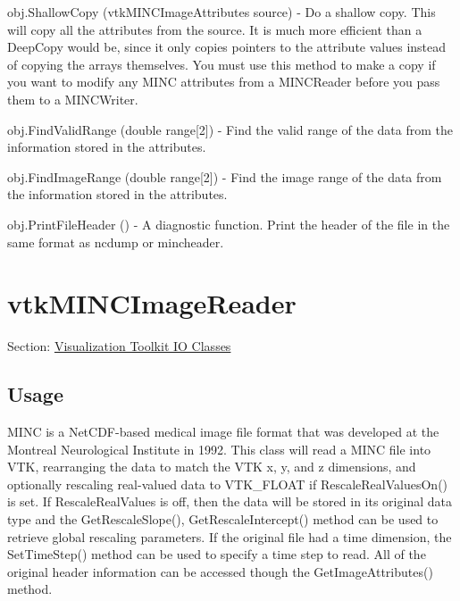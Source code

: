 \begin{DoxyItemize}
\item {\ttfamily obj.\-Shallow\-Copy (vtk\-M\-I\-N\-C\-Image\-Attributes source)} -\/ Do a shallow copy. This will copy all the attributes from the source. It is much more efficient than a Deep\-Copy would be, since it only copies pointers to the attribute values instead of copying the arrays themselves. You must use this method to make a copy if you want to modify any M\-I\-N\-C attributes from a M\-I\-N\-C\-Reader before you pass them to a M\-I\-N\-C\-Writer.  
\item {\ttfamily obj.\-Find\-Valid\-Range (double range\mbox{[}2\mbox{]})} -\/ Find the valid range of the data from the information stored in the attributes.  
\item {\ttfamily obj.\-Find\-Image\-Range (double range\mbox{[}2\mbox{]})} -\/ Find the image range of the data from the information stored in the attributes.  
\item {\ttfamily obj.\-Print\-File\-Header ()} -\/ A diagnostic function. Print the header of the file in the same format as ncdump or mincheader.  
\end{DoxyItemize}\hypertarget{vtkio_vtkmincimagereader}{}\section{vtk\-M\-I\-N\-C\-Image\-Reader}\label{vtkio_vtkmincimagereader}
Section\-: \hyperlink{sec_vtkio}{Visualization Toolkit I\-O Classes} \hypertarget{vtkwidgets_vtkxyplotwidget_Usage}{}\subsection{Usage}\label{vtkwidgets_vtkxyplotwidget_Usage}
M\-I\-N\-C is a Net\-C\-D\-F-\/based medical image file format that was developed at the Montreal Neurological Institute in 1992. This class will read a M\-I\-N\-C file into V\-T\-K, rearranging the data to match the V\-T\-K x, y, and z dimensions, and optionally rescaling real-\/valued data to V\-T\-K\-\_\-\-F\-L\-O\-A\-T if Rescale\-Real\-Values\-On() is set. If Rescale\-Real\-Values is off, then the data will be stored in its original data type and the Get\-Rescale\-Slope(), Get\-Rescale\-Intercept() method can be used to retrieve global rescaling parameters. If the original file had a time dimension, the Set\-Time\-Step() method can be used to specify a time step to read. All of the original header information can be accessed though the Get\-Image\-Attributes() method.

